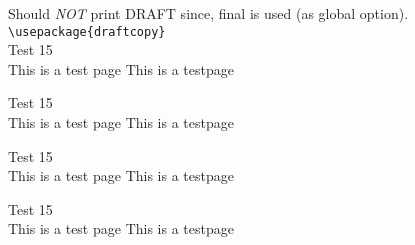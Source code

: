 \documentclass[final,a4paper]{article}
\newcommand{\xx}{
Test 15\\This is a test page \thepage \vfill
This is a testpage \thepage \newpage
}
\begin{document}
Should \emph{NOT} print DRAFT since, final is used (as global option).\\
\verb|\usepackage{draftcopy}|\\
\xx\xx\xx\xx
\end{document}
